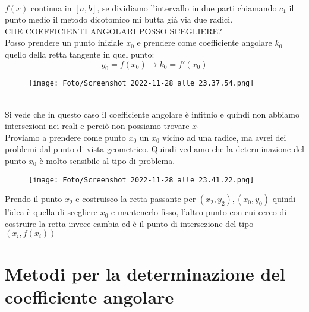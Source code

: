 \documentclass[a4paper, portrait]{book}
\numberwithin{equation}{chapter} %
\begin{document}
\\$f(x)$ continua in $[a,b]$, se dividiamo l'intervallo in due parti chiamando $c_1$ il punto medio il metodo dicotomico mi butta già via due radici.\\
CHE COEFFICIENTI ANGOLARI POSSO SCEGLIERE?\\
Posso prendere un punto iniziale $x_0$ e prendere come coefficiente angolare $k_0$ quello della retta tangente in quel punto:
\begin{equation}
    y_0 = f(x_0) \rightarrow k_0 = f'(x_0)
\end{equation}
\begin{figure}[h!]
    \centering
    \texttt{[image: Foto/Screenshot 2022-11-28 alle 23.37.54.png]}
    \caption{}
\end{figure}
\\Si vede che in questo caso il coefficiente angolare è infitnio e quindi non abbiamo intersezioni nei reali e perciò non possiamo trovare $x_1$\\
Proviamo a prendere come punto $x_0$ un $x_0$ vicino ad una radice, ma avrei dei problemi dal punto di vista geometrico. Quindi vediamo che la determinazione del punto $x_0$ è molto sensibile al tipo di problema.
\newpage
\begin{figure}[h!]
    \centering
    \texttt{[image: Foto/Screenshot 2022-11-28 alle 23.41.22.png]}
    \caption{}
\end{figure}
Prendo il punto $x_2$ e costruisco la retta passante per $(x_2, y_2), (x_0, y_0)$ quindi l'idea è quella di scegliere $x_0$ e mantenerlo fisso, l'altro punto con cui cerco di costruire la retta invece cambia ed è il punto di intersezione del tipo $(x_i, f(x_i))$\\
\newpage
\section*{Metodi per la determinazione del coefficiente angolare}
\end{document}

